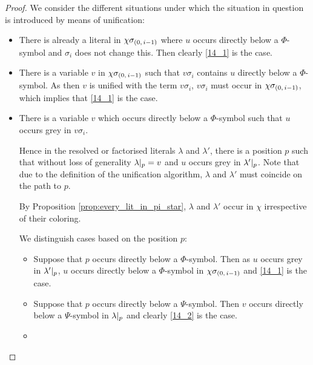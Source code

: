 \documentclass[,%
	draft=false,%
	numbers=noendperiod
	12pt,
	a4paper,
	oneside,%
	openany,
]{memoir}
\newcommand{\inv}{\ensuremath{\chi}}
\begin{document}
\begin{proof}
	We consider the different situations under which the situation in question is introduced by means of unification: 

	\begin{itemize}
		\item
			There is already a literal in $\inv\sigmazmi$ where $u$ occurs directly below a $\Phi$-symbol and $\sigma_i$ does not change this.
			Then clearly \ref{14_1} is the case.

		\item
			There is a variable $v$ in $\inv\sigmazmi$ such that $v\sigma_i$ contains $u$ directly below a $\Phi$-symbol.
			As then $v$ is unified with the term $v\sigma_i$, $v\sigma_i$ must occur in $\inv\sigmazmi$, which implies that \ref{14_1} is the case.

		\item
			There is a variable $v$ which occurs directly below a $\Phi$-symbol such that $u$ occurs grey in $v\sigma_i$.

			Hence in the resolved or factorised literals $\lambda$ and $\lambda'$, there is a position $p$ such that without loss of generality $\lambda|_{p} = v$ and $u$ occurs grey in $\lambda'|_{p}$. 
			Note that due to the definition of the unification algorithm, $\lambda$ and $\lambda'$ must coincide on the path to $p$.

			By Proposition \ref{prop:every_lit_in_pi_star}, $\lambda$ and $\lambda'$ occur in $\inv$ irrespective of their coloring.


			We distinguish cases based on the position $p$:

			\begin{itemize}
				\item Suppose that $p$ occurs directly below a $\Phi$-symbol.
					Then as $u$ occurs grey in  $\lambda'|_{p}$, $u$ occurs directly below a $\Phi$-symbol in $\inv\sigmazmi$ and \ref{14_1} is the case.

				\item Suppose that $p$ occurs directly below a $\Psi$-symbol.
					Then $v$ occurs directly below a $\Psi$-symbol in $\lambda|_{p}$ and clearly \ref{14_2} is the case.

				\item

			\end{itemize}
	\end{itemize}

\end{proof}
\end{document}
